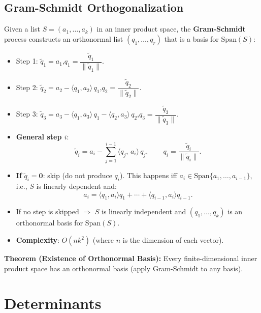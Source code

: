 \documentclass[hidelinks]{article}
\begin{document}
\subsection{Gram-Schmidt Orthogonalization}
Given a list $S = (a_1,\ldots,a_k)$ in an inner product space, the \textbf{Gram-Schmidt} process constructs an orthonormal list $(q_1,\ldots,q_r)$ that is a basis for $\mathrm{Span}(S)$:
\begin{itemize}
    \item Step 1: $\tilde{q}_1 = a_1$,\quad $q_1 = \dfrac{\tilde{q}_1}{\|\tilde{q}_1\|}$.
    \item Step 2: $\tilde{q}_2 = a_2 - \langle q_1,a_2\rangle\, q_1$,\quad $q_2 = \dfrac{\tilde{q}_2}{\|\tilde{q}_2\|}$.
    \item Step 3: $\tilde{q}_3 = a_3 - \langle q_1,a_3\rangle\, q_1 - \langle q_2,a_3\rangle\, q_2$,\quad $q_3 = \dfrac{\tilde{q}_3}{\|\tilde{q}_3\|}$.
    \item \textbf{General step $i$}:
    \[
        \tilde{q}_i = a_i - \sum_{j=1}^{i-1}\langle q_j,\, a_i\rangle\, q_j,\qquad q_i = \frac{\tilde{q}_i}{\|\tilde{q}_i\|}.
    \]
    \item \textbf{If} $\tilde{q}_i = \mathbf{0}$: skip (do not produce $q_i$). This happens iff $a_i \in \mathrm{Span}\{a_1,\ldots,a_{i-1}\}$, i.e., $S$ is linearly dependent and:
    \[
        a_i = \langle q_1,a_i\rangle q_1 + \cdots + \langle q_{i-1},a_i\rangle q_{i-1}.
    \]
    \item If no step is skipped $\Rightarrow$ $S$ is linearly independent and $(q_1,\ldots,q_k)$ is an orthonormal basis for $\mathrm{Span}(S)$.
    \item \textbf{Complexity}: $O(nk^2)$ (where $n$ is the dimension of each vector).
\end{itemize}

\textbf{Theorem (Existence of Orthonormal Basis):} Every finite-dimensional inner product space has an orthonormal basis (apply Gram-Schmidt to any basis).

\section{Determinants}
\end{document}
